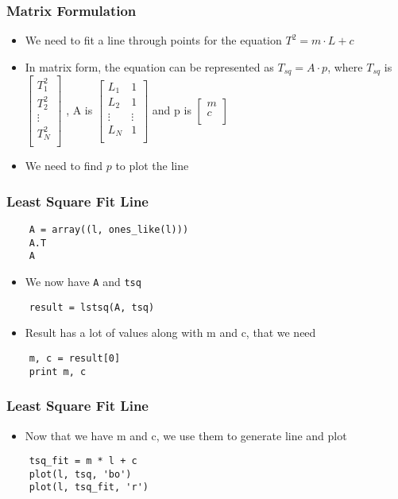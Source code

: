 \begin{frame}[fragile]
  \frametitle{Matrix Formulation}
  \begin{itemize}
  \item We need to fit a line through points for the equation $T^2 = m \cdot L+c$
  \item In matrix form, the equation can be represented as $T_{sq} = A \cdot p$, where $T_{sq}$ is
    $\begin{bmatrix}
    T^2_1 \\
    T^2_2 \\
    \vdots\\
    T^2_N \\
  \end{bmatrix}$
    , A is   
    $\begin{bmatrix}
    L_1 & 1 \\
    L_2 & 1 \\
    \vdots & \vdots\\
    L_N & 1 \\
  \end{bmatrix}$
    and p is 
    $\begin{bmatrix}
      m\\
      c\\
    \end{bmatrix}$
  \item We need to find $p$ to plot the line
  \end{itemize}
\end{frame}

\begin{frame}[fragile]
  \frametitle{Least Square Fit Line}
  \begin{lstlisting}
    A = array((l, ones_like(l)))
    A.T
    A
  \end{lstlisting}
  \begin{itemize}
  \item We now have \texttt{A} and \texttt{tsq}
  \end{itemize}
  \begin{lstlisting}
    result = lstsq(A, tsq)
  \end{lstlisting}
  \begin{itemize}
  \item Result has a lot of values along with m and c, that we need
  \end{itemize}
  \begin{lstlisting}
    m, c = result[0]
    print m, c
  \end{lstlisting}
\end{frame}

\begin{frame}[fragile]
  \frametitle{Least Square Fit Line}
  \begin{itemize}
  \item Now that we have m and c, we use them to generate line and plot
  \end{itemize}
  \begin{lstlisting}
    tsq_fit = m * l + c
    plot(l, tsq, 'bo')
    plot(l, tsq_fit, 'r')
  \end{lstlisting}
\end{frame}

